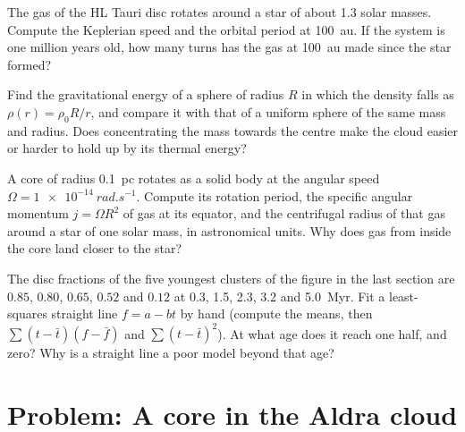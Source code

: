 \begin{exercise}[$\star\star$]\label{exo:b2:ism-star-formation:9}
The gas of the HL Tauri disc rotates around a star of about \num{1.3} solar
masses. Compute the Keplerian speed and the orbital period at \qty{100}{au}.
If the system is one million years old, how many turns has the gas at
\qty{100}{au} made since the star formed?
\end{exercise}

\begin{exercise}[$\star\star\star$]\label{exo:b2:ism-star-formation:10}
Find the gravitational energy of a sphere of radius $R$ in which the density
falls as $\rho(r) = \rho_0 R/r$, and compare it with that of a uniform sphere of
the same mass and radius. Does concentrating the mass towards the centre make
the cloud easier or harder to hold up by its thermal energy?
\end{exercise}

\begin{exercise}[$\star\star\star$]\label{exo:b2:ism-star-formation:11}
A core of radius \qty{0.1}{pc} rotates as a solid body at the angular speed
$\Omega = \qty{1e-14}{rad.s^{-1}}$. Compute its rotation period, the specific
angular momentum $j = \Omega R^2$ of gas at its equator, and the centrifugal
radius of that gas around a star of one solar mass, in astronomical units.
Why does gas from inside the core land closer to the star?
\end{exercise}

\begin{exercise}[$\star\star\star$]\label{exo:b2:ism-star-formation:12}
The disc fractions of the five youngest clusters of the figure in the last
section are $0.85$, $0.80$, $0.65$, $0.52$ and $0.12$ at 0.3, 1.5, 2.3, 3.2 and
\qty{5.0}{Myr}. Fit a least-squares straight line $f = a - bt$ by hand
(compute the means, then $\sum(t - \bar t)(f - \bar f)$ and
$\sum(t - \bar t)^2$). At what age does it reach one half, and zero? Why is a
straight line a poor model beyond that age?
\end{exercise}

\section{Problem: A core in the Aldra cloud}


